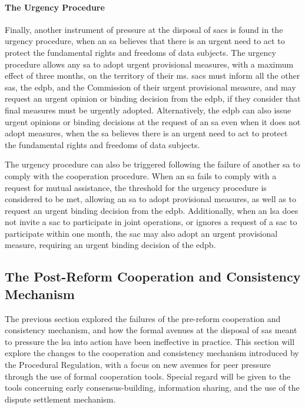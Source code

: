 \paragraph{The Urgency Procedure}
Finally, another instrument of pressure at the disposal of \glspl{sac} is found in the urgency procedure, when an \gls{sa} believes that there is an urgent need to act to protect the fundamental rights and freedoms of data subjects.\autocite[63]{facebookBelgium}
The urgency procedure allows any \gls{sa} to adopt urgent provisional measures, with a maximum effect of three months, on the territory of their \gls{ms}.\autocite[66(1)]{GDPR}
\glspl{sac} must inform all the other \glspl{sa}, the \gls{edpb}, and the Commission of their urgent provisional measure, and may request an urgent opinion or binding decision from the \gls{edpb}, if they consider that final measures must be urgently adopted.\autocite[66(2)]{GDPR}
Alternatively, the \gls{edpb} can also issue urgent opinions or binding decisions at the request of an \gls{sa} even when it does not adopt measures, when the \gls{sa} believes there is an urgent need to act to protect the fundamental rights and freedoms of data subjects.\autocite[66(3)]{GDPR}

The urgency procedure can also be triggered following the failure of another \gls{sa} to comply with the cooperation procedure.
When an \gls{sa} fails to comply with a request for mutual assistance, the threshold for the urgency procedure is considered to be met, allowing an \gls{sa} to adopt provisional measures, as well as to request an urgent binding decision from the \gls{edpb}.\autocite[61(8)]{GDPR}
Additionally, when an \gls{lsa} does not invite a \gls{sac} to participate in joint operations, or ignores a request of a \gls{sac} to participate within one month, the \gls{sac} may also adopt an urgent provisional measure, requiring an urgent binding decision of the \gls{edpb}.\autocite[62(7)]{GDPR}

\subsection{The Post-Reform Cooperation and Consistency Mechanism}
\label{sec:ch3-post-reform-mechanism}

The previous section explored the failures of the pre-reform cooperation and consistency mechanism, and how the formal avenues at the disposal of \glspl{sa} meant to pressure the \gls{lsa} into action have been ineffective in practice. 
This section will explore the changes to the cooperation and consistency mechanism introduced by the Procedural Regulation, with a focus on new avenues for peer pressure through the use of formal cooperation tools.
Special regard will be given to the tools concerning early consensus-building, information sharing, and the use of the dispute settlement mechanism.

